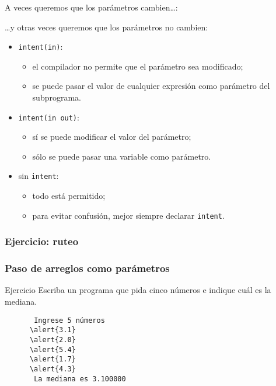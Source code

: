 \documentclass[10pt]{beamer}
\begin{document}
  \begin{frame}
    A veces queremos que los parámetros cambien\dots:
    
  \end{frame}

  \begin{frame}
    \dots y otras veces queremos que los parámetros no cambien:
    
  \end{frame}

  \begin{frame}
    \begin{itemize}
      \item \lstinline+intent(in)+:
      \begin{itemize}
        \item el compilador no permite que el parámetro sea modificado;
        \item se puede pasar el valor de cualquier expresión
          como parámetro del subprograma.
      \end{itemize}
      \item \lstinline+intent(in out)+:
      \begin{itemize}
        \item sí se puede modificar el valor del parámetro;
        \item sólo se puede pasar una variable como parámetro.
      \end{itemize}
      \item sin \lstinline+intent+:
      \begin{itemize}
        \item todo está permitido;
        \item para evitar confusión, mejor siempre declarar \lstinline+intent+.
      \end{itemize}
    \end{itemize}
  \end{frame}

  \begin{frame}
    \frametitle{Ejercicio: ruteo}
    
  \end{frame}

  \begin{frame}
    \frametitle{Paso de arreglos como parámetros}
    
  \end{frame}

  \begin{frame}[fragile]{Ejercicio}
    Escriba un programa que pida cinco números
    e indique cuál es la mediana.

    \begin{Verbatim}
       Ingrese 5 números
      \alert{3.1}
      \alert{2.0}
      \alert{5.4}
      \alert{1.7}
      \alert{4.3}
       La mediana es 3.100000
    \end{Verbatim}

\end{frame}
\end{document}
